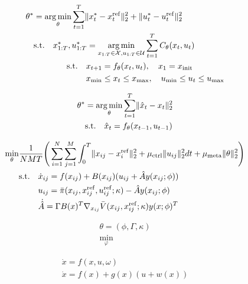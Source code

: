 \begin{align*}
\theta^{*} &= \mathop{\arg\min}_{\theta} \sum_{t=1}^{T} \lVert x_t^{*} - x_t^{{\rm ref}} \rVert _2^2 + \lVert u_t^{*} - u_t^{{\rm ref}} \rVert _2^2 \\
& {\rm s.t.} \quad x_{1:T}^{*}, u_{1:T}^{*} = \mathop{\arg\min}_{x_{1:T} \in \mathcal{X}, u_{1:T} \in \mathcal{U}}  \sum_{t=1}^{T}C_{\theta}(x_t, u_t) \\
& \qquad\qquad {\rm s.t.} \quad x_{t+1} = f_{\theta}(x_t, u_t), \quad x_1 = x_{{\rm init}} \\
& \qquad\qquad \qquad \ x_{{\rm min}} \leq x_t \leq x_{{\rm max}}, \quad u_{{\rm min}} \leq u_t \leq u_{{\rm max}}
\end{align*}


\begin{align*}
    \theta^{*} &= \mathop{\arg\min}_{\theta} \sum_{t=1}^{T} \lVert \hat{x}_t - x_t \rVert _2^2 \\
    &{\rm s.t.} \quad \hat{x}_t = f_{\theta}(x_{t-1}, u_{t-1})
\end{align*}




\begin{align*}
    \min_{\theta} & \frac{1}{NMT} \Bigg( \sum_{i=1}^{N}\sum_{j=1}^{M} \int_0^T \lVert x_{ij} - x_i^{\rm ref} \rVert _2^2 + \mu_{{\rm ctrl}}  \lVert u_{ij} \rVert _2^2  dt + \mu_{{\rm meta}}  \lVert \theta \rVert _2^2  \Bigg)  \\
    & {\rm s.t.} \quad \dot{x}_{ij} = f(x_{ij}) + B(x_{ij})(u_{ij} + \hat{A}y(x_{ij}; \phi))    \\
    & \qquad \ u_{ij} = \bar{\pi}(x_{ij}, x_{ij}^{\rm ref}, u_{ij}^{\rm ref}; \kappa) - \hat{A}y(x_{ij}; \phi)   \\
    & \qquad \ \dot{\hat{A}} = \Gamma B(x)^T  \nabla_{x_{ij}} \bar{V}(x_{ij}, x_{ij}^{\rm ref}; \kappa) y(x; \phi) ^T
\end{align*}

\begin{align*}
    \theta = (\phi, \Gamma, \kappa) \\
    \min_{\varphi}
\end{align*}





\begin{align*}
    \dot{x} = f(x, u, \omega) \\
    \dot{x} = f(x) + g(x) (u + w(x)) \\
\end{align*}

